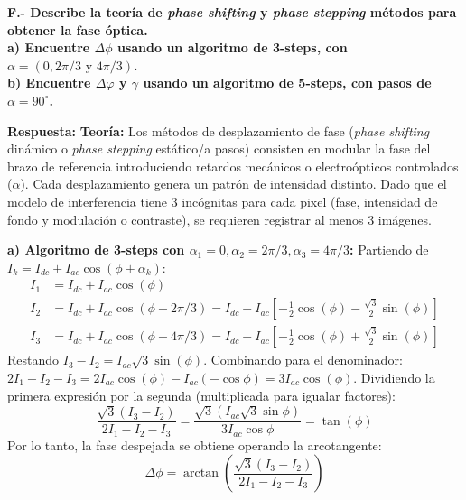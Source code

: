 \documentclass[12pt,letterpaper]{article}
\begin{document}
	\vspace{0.8cm}
	\noindent \textbf{F.- Describe la teoría de \textit{phase shifting} y \textit{phase stepping} métodos para obtener la fase óptica.\\
		a) Encuentre $\Delta\phi$ usando un algoritmo de 3-steps, con $\alpha=(0, 2\pi/3 \text{ y } 4\pi/3)$.\\
		b) Encuentre $\Delta\varphi$ y $\gamma$ usando un algoritmo de 5-steps, con pasos de $\alpha=90^\circ$.}
	
	\textbf{Respuesta:}
	\textbf{Teoría:} Los métodos de desplazamiento de fase (\textit{phase shifting} dinámico o \textit{phase stepping} estático/a pasos) consisten en modular la fase del brazo de referencia introduciendo retardos mecánicos o electroópticos controlados ($\alpha$). Cada desplazamiento genera un patrón de intensidad distinto. Dado que el modelo de interferencia tiene 3 incógnitas para cada pixel (fase, intensidad de fondo y modulación o contraste), se requieren registrar al menos 3 imágenes.
	
	\textbf{a) Algoritmo de 3-steps con $\alpha_1=0, \alpha_2=2\pi/3, \alpha_3=4\pi/3$:}
	Partiendo de $I_k = I_{dc} + I_{ac}\cos(\phi + \alpha_k)$:
	\begin{align*}
		I_1 &= I_{dc} + I_{ac}\cos(\phi) \\
		I_2 &= I_{dc} + I_{ac}\cos(\phi + 2\pi/3) = I_{dc} + I_{ac}\left[-\frac{1}{2}\cos(\phi) - \frac{\sqrt{3}}{2}\sin(\phi)\right] \\
		I_3 &= I_{dc} + I_{ac}\cos(\phi + 4\pi/3) = I_{dc} + I_{ac}\left[-\frac{1}{2}\cos(\phi) + \frac{\sqrt{3}}{2}\sin(\phi)\right]
	\end{align*}
	Restando $I_3 - I_2 = I_{ac}\sqrt{3}\sin(\phi)$.
	Combinando para el denominador: $2I_1 - I_2 - I_3 = 2I_{ac}\cos(\phi) - I_{ac}(-\cos\phi) = 3I_{ac}\cos(\phi)$.
	Dividiendo la primera expresión por la segunda (multiplicada para igualar factores):
	\[
	\frac{\sqrt{3}(I_3 - I_2)}{2I_1 - I_2 - I_3} = \frac{\sqrt{3}(I_{ac}\sqrt{3}\sin\phi)}{3I_{ac}\cos\phi} = \tan(\phi)
	\]
	Por lo tanto, la fase despejada se obtiene operando la arcotangente:
	\[
	\Delta\phi = \arctan\left( \frac{\sqrt{3}(I_3 - I_2)}{2I_1 - I_2 - I_3} \right)
	\]
	
\end{document}
